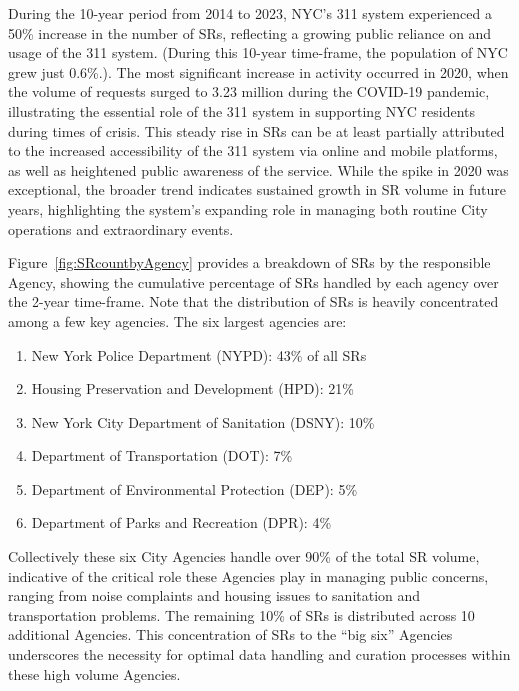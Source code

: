 \documentclass[linenumber]{jdsart}
\begin{document}
During the 10-year period from 2014 to 2023,  NYC's 311 system
experienced a 50\% increase in the number of SRs, 
reflecting a growing public reliance on and usage of 
the 311 system. (During this 10-year time-frame, the 
population of NYC grew just 0.6\%.). The most significant increase
in activity occurred in 2020, when the volume of requests 
surged to 3.23 million during the COVID-19 pandemic, 
illustrating the essential role of the 311 system in supporting 
NYC residents during times of crisis. This steady 
rise in SRs can be at least partially attributed to the increased 
accessibility of the 311 system via online and mobile 
platforms, as well as heightened public awareness of the service. 
While the spike in 2020 was exceptional, the broader trend 
indicates sustained growth in SR volume in future years,  
highlighting the system's expanding role in managing 
both routine City operations and extraordinary events.



Figure~\ref{fig:SRcountbyAgency} provides a breakdown of SRs by
the responsible Agency, showing the cumulative 
percentage of SRs handled by each
agency over the 2-year time-frame. Note that the
distribution of SRs is heavily concentrated among a few key 
agencies. The six largest agencies are:

\begin{enumerate}[left=1.5em]
    \item New York Police Department (NYPD): 43\% of all SRs
    \item Housing Preservation and Development (HPD): 21\%
    \item New York City Department of Sanitation (DSNY): 10\%
    \item Department of Transportation (DOT): 7\%
    \item Department of Environmental Protection (DEP): 5\%
    \item Department of Parks and Recreation (DPR): 4\%
\end{enumerate}


Collectively these six City Agencies handle over 90\% of the total SR 
volume, indicative of the critical role these Agencies play in managing
public concerns, ranging from noise complaints and housing issues to
sanitation and transportation problems. The remaining
10\% of SRs is distributed across 10 additional Agencies. 
This concentration of SRs to the ``big six'' Agencies 
underscores the necessity for optimal data handling and 
curation processes within these  high volume Agencies.
\end{document}
